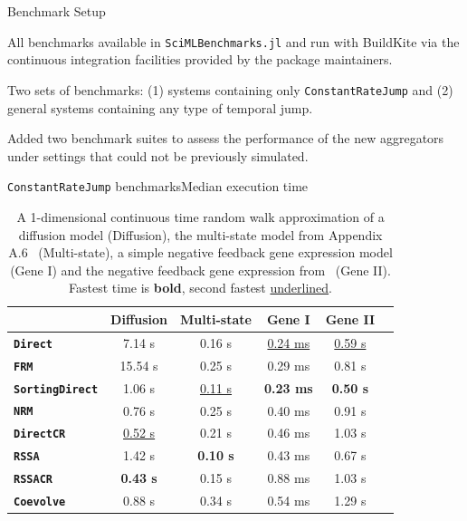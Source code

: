 \documentclass[
  ignorenonframetext,
  aspectratio=169,
  xcolor={dvipsnames,rgb}
]{beamer}
\begin{document}
\begin{frame}{Benchmark Setup}

All benchmarks available in \texttt{SciMLBenchmarks.jl} and run with BuildKite via the continuous integration facilities provided by the package maintainers.

\vspace{2em}

Two sets of benchmarks: (1) systems containing only \texttt{ConstantRateJump} and (2) general systems containing any type of temporal jump.

\vspace{2em}

Added two benchmark suites to assess the performance of the new aggregators under settings that could not be previously simulated.

\end{frame}

\begin{frame}{\texttt{ConstantRateJump} benchmarks}{Median execution time}

\begin{table}
\centering
\begin{tabular}{lccccc}
\toprule
 & \multicolumn{1}{c}{\textbf{ Diffusion }} & \multicolumn{1}{c}{\textbf{ Multi-state }} & \multicolumn{1}{c}{\textbf{ Gene I }} & \multicolumn{1}{c}{\textbf{ Gene II }} \\
\hline
\textbf{\texttt{Direct}}         & 7.14 s             & 0.16 s             & \underline{0.24 ms} & \underline{0.59 s} \\
\textbf{\texttt{FRM}}            & 15.54 s            & 0.25 s             & 0.29 ms             & 0.81 s             \\
\textbf{\texttt{SortingDirect}}  & 1.06 s             & \underline{0.11 s} & \textbf{0.23 ms}    & \textbf{0.50 s}    \\
\textbf{\texttt{NRM}}            & 0.76 s             & 0.25 s             & 0.40 ms             & 0.91 s             \\
\textbf{\texttt{DirectCR}}       & \underline{0.52 s} & 0.21 s             & 0.46 ms             & 1.03 s             \\
\textbf{\texttt{RSSA}}           & 1.42 s             & \textbf{0.10 s}    & 0.43 ms             & 0.67 s             \\
\textbf{\texttt{RSSACR}}         & \textbf{0.43 s}    & 0.15 s             & 0.88 ms             & 1.03 s             \\
\textbf{\texttt{Coevolve}}       & 0.88 s             & 0.34 s             & 0.54 ms             & 1.29 s             \\
\bottomrule
\end{tabular}
\caption{A 1-dimensional continuous time random walk approximation of a diffusion model (Diffusion), the multi-state model from Appendix A.6~\citet{marchetti2017} (Multi-state), a simple negative feedback gene expression model (Gene I) and the negative feedback gene expression from~\citet{gupta2018} (Gene II). Fastest time is \textbf{bold}, second fastest \underline{underlined}.}
\end{table}

\end{frame}
\end{document}
